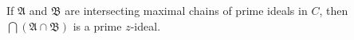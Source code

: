 If $\mathfrak{A}$ and $\mathfrak{B}$ are intersecting maximal chains of prime ideals in $C$, then $\bigcap (\mathfrak{A} \cap \mathfrak{B})$ is a prime $z$-ideal.
